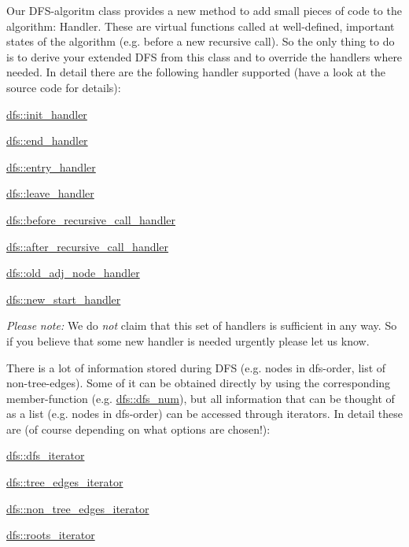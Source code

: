 Our D\+F\+S-\/algoritm class provides a new method to add small pieces of code to the algorithm\+: Handler. These are virtual functions called at well-\/defined, important states of the algorithm (e.\+g. before a new recursive call). So the only thing to do is to derive your extended D\+FS from this class and to override the handlers where needed. In detail there are the following handler supported (have a look at the source code for details)\+:
\begin{DoxyItemize}
\item \mbox{\hyperlink{classdfs_acc82574cd42ab8256e685374bee5fabb}{dfs\+::init\+\_\+handler}}
\item \mbox{\hyperlink{classdfs_ab96c7c6183856dd9e356fdcf50835b32}{dfs\+::end\+\_\+handler}}
\item \mbox{\hyperlink{classdfs_a73dabe5882226b53494a487b7c34f1d1}{dfs\+::entry\+\_\+handler}}
\item \mbox{\hyperlink{classdfs_a8071fc4e82deff7ceb2790cd4eb42280}{dfs\+::leave\+\_\+handler}}
\item \mbox{\hyperlink{classdfs_ae3f095c9fe6106e82c24543da4844ea3}{dfs\+::before\+\_\+recursive\+\_\+call\+\_\+handler}}
\item \mbox{\hyperlink{classdfs_a25ae75fe08f1d8c0fedcf9dcae09d092}{dfs\+::after\+\_\+recursive\+\_\+call\+\_\+handler}}
\item \mbox{\hyperlink{classdfs_adf1c667188e632761c63f529537c544c}{dfs\+::old\+\_\+adj\+\_\+node\+\_\+handler}}
\item \mbox{\hyperlink{classdfs_a3b5fbea7a7baed9946cfb4444a7f20ea}{dfs\+::new\+\_\+start\+\_\+handler}}
\end{DoxyItemize}

{\itshape Please} {\itshape note\+:} We do {\itshape not} claim that this set of handlers is sufficient in any way. So if you believe that some new handler is needed urgently please let us know.

There is a lot of information stored during D\+FS (e.\+g. nodes in dfs-\/order, list of non-\/tree-\/edges). Some of it can be obtained directly by using the corresponding member-\/function (e.\+g. \mbox{\hyperlink{classdfs_a315f16831a0bd333960e87e045cb37c8}{dfs\+::dfs\+\_\+num}}), but all information that can be thought of as a list (e.\+g. nodes in dfs-\/order) can be accessed through iterators. In detail these are (of course depending on what options are chosen!)\+:
\begin{DoxyItemize}
\item \mbox{\hyperlink{classdfs_ad040ddae37492e18c8e029406d667bd9}{dfs\+::dfs\+\_\+iterator}}
\item \mbox{\hyperlink{classdfs_a0eee0ddec5343c05f617d6d7aabb6d19}{dfs\+::tree\+\_\+edges\+\_\+iterator}}
\item \mbox{\hyperlink{classdfs_ae7301f3d4417e60fb3a499180375194e}{dfs\+::non\+\_\+tree\+\_\+edges\+\_\+iterator}}
\item \mbox{\hyperlink{classdfs_a17cb59c8a1fead11fa6b0c85cf5a478e}{dfs\+::roots\+\_\+iterator}} 
\end{DoxyItemize}

